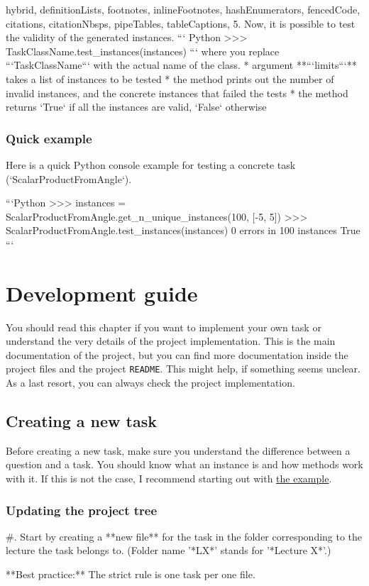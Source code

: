 \documentclass[
  digital, %
  table,   %
  twoside, %
  nolof,     %
  nolot,     %
  draft=false,
  final,
]{fithesis3}
\begin{document}
\begin{markdown*}{%
  hybrid,
  definitionLists,
  footnotes,
  inlineFootnotes,
  hashEnumerators,
  fencedCode,
  citations,
  citationNbsps,
  pipeTables,
  tableCaptions,
}
5. Now, it is possible to test the validity of the generated instances. 
``` Python
>>> TaskClassName.test_instances(instances)
```
where you replace ```TaskClassName``` with the actual name of the class. 
    * argument **```limits```** takes a list of instances to be tested
    * the method prints out the number of invalid instances, and the concrete instances that failed the tests
    * the method returns `True` if all the instances are valid, `False` otherwise


\subsection{Quick example}

Here is a quick Python console example for testing a concrete task (`ScalarProductFromAngle`). 

```Python
>>> instances = ScalarProductFromAngle.get_n_unique_instances(100, [-5, 5])
>>> ScalarProductFromAngle.test_instances(instances)
0 errors in 100 instances
True
```


\chapter{Development guide}

You should read this chapter if you want to implement your own task or understand the very details of the project implementation. This is the main documentation of the project, but you can find more documentation inside the project files and the project \verb|README|. This might help, if something seems unclear. As a last resort, you can always check the project implementation.

\section{Creating a new task}

Before creating a new task, make sure you understand the difference between a question and a task. You should know what an instance is and how methods work with it. If this is not the case, I recommend starting out with \hyperref[sec:example]{the example}. 

\subsection{Updating the project tree}

#. Start by creating a **new file** for the task in the folder corresponding to the lecture
the task belongs to. (Folder name '*LX*' stands for '*Lecture X*'.) 
\begin{shaded}{**Best practice:**}
    The strict rule is one task per one file.
\end{shaded}


\end{markdown*}
\end{document}
